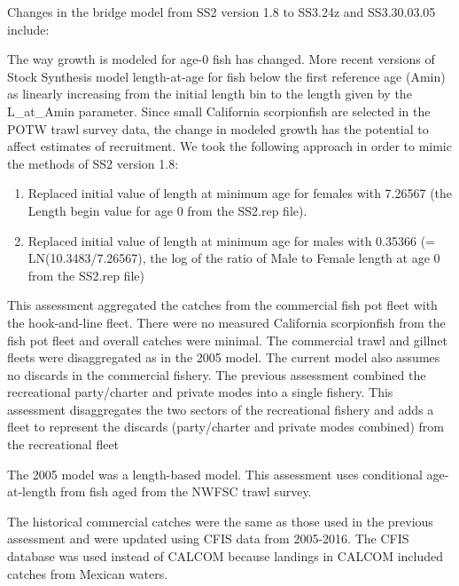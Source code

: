 \documentclass[12pt,]{article}
\begin{document}
Changes in the bridge model from SS2 version 1.8 to SS3.24z and
SS3.30.03.05 include:

The way growth is modeled for age-0 fish has changed. More recent
versions of Stock Synthesis model length-at-age for fish below the first
reference age (Amin) as linearly increasing from the initial length bin
to the length given by the L\_at\_Amin parameter. Since small California
scorpionfish are selected in the POTW trawl survey data, the change in
modeled growth has the potential to affect estimates of recruitment. We
took the following approach in order to mimic the methods of SS2 version
1.8:

\begin{enumerate}
 
 \item Replaced initial value of length at minimum age for females with 7.26567 (the Length begin value for age 
 0 from the SS2.rep file).
 
  \item Replaced initial value of length at minimum age for males with 0.35366 (= LN(10.3483/7.26567), the 
  log of the ratio of Male to Female length at age 0 from the SS2.rep file)

\end{enumerate}

This assessment aggregated the catches from the commercial fish pot
fleet with the hook-and-line fleet. There were no measured California
scorpionfish from the fish pot fleet and overall catches were minimal.
The commercial trawl and gillnet fleets were disaggregated as in the
2005 model. The current model also assumes no discards in the commercial
fishery. The previous assessment combined the recreational party/charter
and private modes into a single fishery. This assessment disaggregates
the two sectors of the recreational fishery and adds a fleet to
represent the discards (party/charter and private modes combined) from
the recreational fleet

The 2005 model was a length-based model. This assessment uses
conditional age-at-length from fish aged from the NWFSC trawl survey.

The historical commercial catches were the same as those used in the
previous assessment and were updated using CFIS data from 2005-2016. The
CFIS database was used instead of CALCOM because landings in CALCOM
included catches from Mexican waters.
\end{document}
